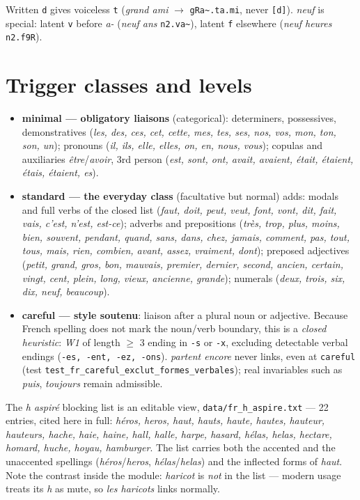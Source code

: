 \documentclass[11pt,a4paper]{report}
\newcommand{\smp}[1]{\texttt{#1}}          %
\newcommand{\tld}{\textasciitilde{}}      %
\begin{document}
\noindent Written \smp{d} gives voiceless \smp{t} (\emph{grand ami}
$\rightarrow$ \smp{gRa\tld.ta.mi}, never \smp{[d]}). \emph{neuf} is special:
latent \smp{v} before \emph{a-} (\emph{neuf ans} \smp{n2.va\tld}), latent
\smp{f} elsewhere (\emph{neuf heures} \smp{n2.f9R}).

\section{Trigger classes and levels}

\begin{itemize}
  \item \textbf{minimal — obligatory liaisons} (categorical): determiners,
        possessives, demonstratives (\emph{les, des, ces, cet, cette, mes,
        tes, ses, nos, vos, mon, ton, son, un}); pronouns (\emph{il, ils,
        elle, elles, on, en, nous, vous}); copulas and auxiliaries
        \emph{\^etre}/\emph{avoir}, 3rd person (\emph{est, sont, ont, avait,
        avaient, \'etait, \'etaient, \'etais, \'etaient, es}).
  \item \textbf{standard — the everyday class} (facultative but normal)
        adds: modals and full verbs of the closed list (\emph{faut, doit,
        peut, veut, font, vont, dit, fait, vais, c'est, n'est, est-ce});
        adverbs and prepositions (\emph{tr\`es, trop, plus, moins, bien,
        souvent, pendant, quand, sans, dans, chez, jamais, comment, pas,
        tout, tous, mais, rien, combien, avant, assez, vraiment, dont});
        preposed adjectives (\emph{petit, grand, gros, bon, mauvais,
        premier, dernier, second, ancien, certain, vingt, cent, plein, long,
        vieux, ancienne, grande}); numerals (\emph{deux, trois, six, dix,
        neuf, beaucoup}).
  \item \textbf{careful — style soutenu}: liaison after a plural noun or
        adjective. Because French spelling does not mark the noun/verb
        boundary, this is a \emph{closed heuristic}: \emph{W1} of length
        $\geq$ 3 ending in \smp{-s} or \smp{-x}, excluding detectable verbal
        endings (\smp{-es, -ent, -ez, -ons}). \emph{partent encore} never
        links, even at \smp{careful} (test
        \smp{test\_fr\_careful\_exclut\_formes\_verbales}); real
        invariables such as \emph{puis}, \emph{toujours} remain admissible.
\end{itemize}

The \emph{h aspir\'e} blocking list is an editable view,
\smp{data/fr\_h\_aspire.txt} --- 22 entries, cited here in full:
\emph{h\'eros, heros, haut, hauts, haute, hautes, hauteur, hauteurs,
hache, haie, haine, hall, halle, harpe, hasard, h\'elas, helas,
hectare, homard, huche, hoyau, hamburger}. The list carries both the
accented and the unaccented spellings (\emph{h\'eros}/\emph{heros},
\emph{h\'elas}/\emph{helas}) and the inflected forms of \emph{haut}.
Note the contrast inside the module: \emph{haricot} is
\emph{not} in the list — modern usage treats its \emph{h} as mute, so
\emph{les haricots} links normally.
\end{document}
